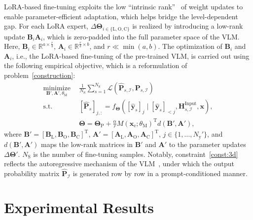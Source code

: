 \documentclass[journal,12pt,onecolumn,draftclsnofoot]{IEEEtran}
\newcommand\IC{\ensuremath{\mathcal{I}}}
\newcommand\LC{\ensuremath{\mathcal{L}}}
\newcommand\PB{\ensuremath{\bm{P}}}
\newcommand\wB{\ensuremath{\bm{w}}}
\newcommand\xB{\ensuremath{\bm{x}}}
\newcommand\yB{\ensuremath{\bm{y}}}
\newcommand\AF{\ensuremath{\mathbf{A}}}
\newcommand\BF{\ensuremath{\mathbf{B}}}
\newcommand\HF{\ensuremath{\mathbf{H}}}
\newcommand\CR{\ensuremath{\mathrm{C}}}
\newcommand\LR{\ensuremath{\mathrm{L}}}
\newcommand\MR{\ensuremath{\mathrm{M}}}
\newcommand\ROR{\ensuremath{\mathrm{O}}}
\newcommand\PR{\ensuremath{\mathrm{P}}}
\newcommand\SR{\ensuremath{\mathrm{S}}}
\newcommand\TR{\ensuremath{\mathrm{T}}}
\newcommand\yR{\ensuremath{\mathrm{y}}}
\newcommand{\wh}{\widehat}
\begin{document}
LoRA-based fine-tuning exploits the low “intrinsic rank”~\cite{hu2022lora} of weight updates to enable parameter-efficient adaptation, which helps bridge the level-dependent gap. For each LoRA expert, $\Delta\mathbf{\Theta}_{i\in \{\LR, \ROR, \CR\}}$ is realized by introducing a low-rank update $\BF_{i}\AF_{i}$, 
which is zero-padded into the full parameter space of the VLM. 
Here, $\BF_{i}\in\mathbb{R}^{a\times \frac{r}{3}}$, $\AF_{i}\in\mathbb{R}^{\frac{r}{3}\times b}$, and $r\ll \min(a,b)$. The optimization of $\BF_{i}$ and $\AF_{i}$, i.e., the LoRA-based fine-tuning of the pre-trained VLM, is carried out using the following empirical objective, 
which is a reformulation of problem~\eqref{construction}:
\begin{subequations}\label{final_construction}
\begin{align}
\underset{\BF',\AF',\theta_{\MR}}{\mathrm{minimize}}~~&
\frac{1}{N_{\SR}}\sum_{s=1}^{N_{\SR}}\LC\!\left(\wh{\PB}_{s,\IC},\PB_{s,\IC}\right) \label{const:3a}\\
\text{s.t.}~~&
[\wh{\PB}_{s}]_{j,:}=f_{\mathbf{\Theta}}\!\left([\wh{\yB}_{s}]_{j}\mid [\wh{\yB}_{s}]_{<j},\HF^{\mathrm{Input}}_{s,\IC},\xB\right), \label{const:3d}\\
&
\mathbf{\Theta}\!=\!\mathbf{\Theta}_{\PR}+\frac{\alpha}{r}M(\xB_{\mathrm{e}};\theta_{\MR})^{\TR}d(\BF',\AF'), \label{const:3r}
\end{align}
\end{subequations} where $\BF'=[\BF_{\LR},\BF_{\ROR},\BF_{\CR}]^{\TR}$, $\AF'=[\AF_{\LR},\AF_{\ROR},\AF_{\CR}]^{\TR}$, $j\in\{1,\ldots,N_{\yR}'\}$, and $d(\BF',\AF')$ maps the low-rank matrices in $\BF'$ and $\AF'$ 
to the parameter updates $\Delta\mathbf{\Theta}'$. $N_{\SR}$ is the number of fine-tuning samples. Notably, constraint~\eqref{const:3d} reflects the autoregressive mechanism of the VLM~\cite{bai2025qwen2}, 
under which the output probability matrix $\wh{\PB}_{\IC}$ is generated row by row 
in a prompt-conditioned manner.

\section{Experimental Results}
\label{sec:res}

\end{document}
